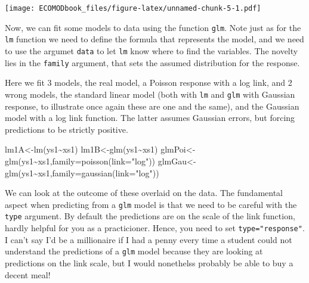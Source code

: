 \documentclass[
]{book}
\newenvironment{Shaded}{\begin{snugshade}}{\end{snugshade}}
\newcommand{\AttributeTok}[1]{\textcolor[rgb]{0.77,0.63,0.00}{#1}}
\newcommand{\FunctionTok}[1]{\textcolor[rgb]{0.00,0.00,0.00}{#1}}
\newcommand{\NormalTok}[1]{#1}
\newcommand{\OtherTok}[1]{\textcolor[rgb]{0.56,0.35,0.01}{#1}}
\newcommand{\SpecialCharTok}[1]{\textcolor[rgb]{0.00,0.00,0.00}{#1}}
\newcommand{\StringTok}[1]{\textcolor[rgb]{0.31,0.60,0.02}{#1}}
\begin{document}
\texttt{[image: ECOMODbook\_files/figure-latex/unnamed-chunk-5-1.pdf]}

Now, we can fit some models to data using the function \texttt{glm}. Note just as for the \texttt{lm} function we need to define the formula that represents the model, and we need to use the argumet \texttt{data} to let \texttt{lm} know where to find the variables. The novelty lies in the \texttt{family} argument, that sets the assumed distribution for the response.

Here we fit 3 models, the real model, a Poisson response with a log link, and 2 wrong models, the standard linear model (both with \texttt{lm} and \texttt{glm} with Gaussian response, to illustrate once again these are one and the same), and the Gaussian model with a log link function. The latter assumes Gaussian errors, but forcing predictions to be strictly positive.

\begin{Shaded}
\begin{Highlighting}[]
\NormalTok{lm1A}\OtherTok{\textless{}{-}}\FunctionTok{lm}\NormalTok{(ys1}\SpecialCharTok{\textasciitilde{}}\NormalTok{xs1)}
\NormalTok{lm1B}\OtherTok{\textless{}{-}}\FunctionTok{glm}\NormalTok{(ys1}\SpecialCharTok{\textasciitilde{}}\NormalTok{xs1)}
\NormalTok{glmPoi}\OtherTok{\textless{}{-}}\FunctionTok{glm}\NormalTok{(ys1}\SpecialCharTok{\textasciitilde{}}\NormalTok{xs1,}\AttributeTok{family=}\FunctionTok{poisson}\NormalTok{(}\AttributeTok{link=}\StringTok{"log"}\NormalTok{))}
\NormalTok{glmGau}\OtherTok{\textless{}{-}}\FunctionTok{glm}\NormalTok{(ys1}\SpecialCharTok{\textasciitilde{}}\NormalTok{xs1,}\AttributeTok{family=}\FunctionTok{gaussian}\NormalTok{(}\AttributeTok{link=}\StringTok{"log"}\NormalTok{))}
\end{Highlighting}
\end{Shaded}

We can look at the outcome of these overlaid on the data. The fundamental aspect when predicting from a \texttt{glm} model is that we need to be careful with the \texttt{type} argument. By default the predictions are on the scale of the link function, hardly helpful for you as a practicioner. Hence, you need to set \texttt{type="response"}. I can't say I'd be a millionaire if I had a penny every time a student could not understand the predictions of a \texttt{glm} model because they are looking at predictions on the link scale, but I would nonethelss probably be able to buy a decent meal!
\end{document}
